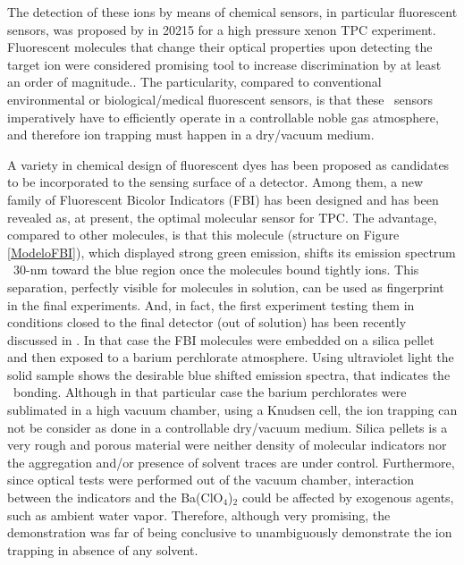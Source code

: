 \documentclass[aps,prl,reprint,longbibliography,superscriptaddress, english]{revtex4-1}
\begin{document}
The detection of these ions by means of chemical sensors, in particular fluorescent sensors, was proposed by in 20215 for a high pressure xenon TPC experiment\cite{Nygren_2015}. Fluorescent molecules that change their optical properties upon detecting the target ion were considered promising tool to increase discrimination by at least an order of magnitude.\cite{valeur_chemical}. The particularity, compared to conventional environmental or biological/medical fluorescent sensors, is that these \bbonu\ sensors  imperatively have to efficiently operate in a controllable noble gas atmosphere, and therefore ion trapping must happen in a dry/vacuum medium. 

A variety in chemical design of fluorescent dyes has been proposed as candidates to be incorporated to the sensing surface of a detector.\cite{valeur_chemical,wolfbeis_materials_2005,Jones:2016qiq, McDonald:2017izm, thapa_barium_2019, thapa_demonstration_2021,D1CP01203G} Among them, a new family of Fluorescent Bicolor Indicators (FBI) has been designed and has been revealed as, at present, the optimal molecular sensor for TPC.\cite{rivilla_fluorescent_2020} The advantage, compared to other molecules, is that this molecule (structure on Figure \ref{ModeloFBI}), which displayed strong green emission, shifts its emission spectrum ~30-nm toward the blue region once the molecules bound tightly \Bapp ions. This separation, perfectly visible for molecules in solution, can be used as fingerprint in the final experiments. And, in fact, the first experiment testing them in conditions closed to the final detector (out of solution) has been recently discussed in \cite{rivilla_fluorescent_2020}. In that case the FBI molecules were embedded on a silica pellet and then exposed to a barium perchlorate atmosphere. Using ultraviolet light the solid sample shows the desirable blue shifted emission spectra, that indicates the \Bapp\ bonding. Although in that particular case the barium perchlorates were sublimated in a high vacuum chamber, using a Knudsen cell, the ion trapping can not be consider as done in a controllable dry/vacuum medium. Silica pellets is a very rough and porous material were neither density of molecular indicators nor the aggregation and/or presence of solvent traces are under control. Furthermore, since optical tests were performed out of the vacuum chamber, interaction between the indicators and the Ba(ClO$_4$)$_2$ could be affected by exogenous agents, such as ambient water vapor. Therefore, although very promising, the demonstration was far of being conclusive to unambiguously demonstrate the ion trapping in absence of any solvent.
\end{document}
